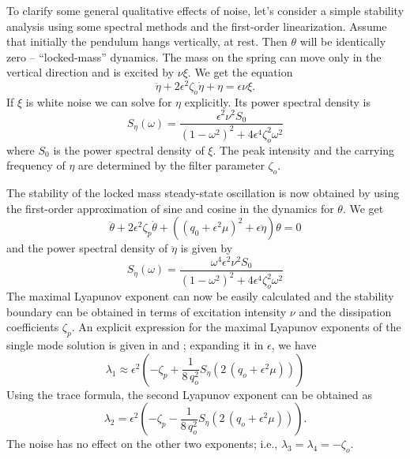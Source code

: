 To clarify some general qualitative effects of noise, let's consider a simple stability analysis using some spectral methods and the first-order linearization. Assume that initially the pendulum hangs vertically, at rest. Then $\theta$ will be identically zero -- ``locked-mass'' dynamics. The mass on the spring can move only in the vertical direction and is excited by $\nu \xi$. We get the equation
\[
\ddot \eta + 2 \epsilon^2 \zeta_o \dot \eta + \eta = \epsilon \nu \xi.
\]
If $\xi$ is white noise we can solve for $\eta$ explicitly. Its power spectral density is
\[
S_\eta(\omega)=\frac{\epsilon^2\nu^2 S_0}{(1-\omega^2)^2+4\epsilon^4\zeta_o^2 \omega^2}
\]
where $S_0$ is the power spectral density of $\xi$. The peak intensity and the carrying frequency of $\eta$ are determined by the filter parameter $\zeta_o$.

The stability of the locked mass steady-state oscillation is now obtained by using the first-order approximation of sine and cosine in the dynamics for $\theta$. We get
\[
\ddot \theta + 2 \epsilon^2 \zeta_p \dot \theta + ( (q_0+\epsilon^2\mu)^2 + \epsilon \ddot \eta ) \theta =0
\]
and the power spectral density of $\ddot\eta$ is given by
\[
S_{\ddot \eta} (\omega) = \frac {\omega^4 \epsilon^2 \nu^2 S_0}{(1 - \omega^2)^2 + 4 \epsilon^4 \zeta_o^2 \omega^2}
\]
The maximal Lyapunov exponent can now be easily calculated and the stability boundary can be obtained in terms of excitation intensity $\nu$ and the dissipation coefficients $\zeta_p$. An explicit expression for the maximal Lyapunov exponents of the single mode solution is given
in \citet{arnold86:_asymp_analy_lyapun_expon} and \citet{namachchivaya87:_stoch_pertur_hopf_bifur}; expanding it in $\epsilon$, we have
\[
\lambda_1 \approx \epsilon^2 \left( - \zeta_p + \frac{1}{8 \, q_o^2} S_{\ddot \eta}(2 \,(q_o+\epsilon^2\mu))\right)
\]
Using the trace formula, the second Lyapunov exponent can be obtained as
\[
\lambda_2 = \epsilon^2 \left( - \zeta_p - \frac{1}{8 \, q_o^2} S_{\ddot \eta}(2 \,(q_o+\epsilon^2\mu)) \right).
\]
The noise has no effect on the other two exponents; i.e., $\lambda_3=\lambda_{4}= - \zeta_o$.

